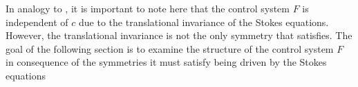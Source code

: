  In analogy to \cite{Alouges2017}, it is important to note here that the control system $F$ is independent of $c$ due to the translational invariance of the Stokes equations. However, the translational invariance is not the only symmetry that \spr satisfies. The goal of the following section is to examine the structure of the control system $F$ in consequence of the symmetries it must satisfy being driven by the Stokes equations





























